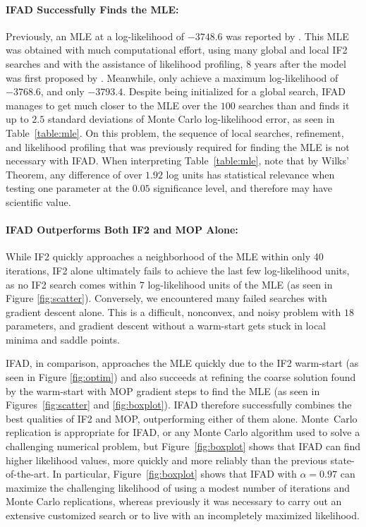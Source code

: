 \documentclass[9pt,twocolumn,pnasresearcharticle]{pnas-new}
\begin{document}
\paragraph{IFAD Successfully Finds the MLE:} Previously, an MLE at a log-likelihood of $-3748.6$ was reported by \cite{king16}.
This MLE was obtained with much computational effort, using many global and local IF2 searches and with the assistance of likelihood profiling, 8 years after the model was first proposed by \cite{king08}.
Meanwhile, \cite{ionides15} only achieve a maximum log-likelihood of $-3768.6$, and \cite{king08} only $-3793.4$.
Despite being initialized for a global search, IFAD manages to get much closer to the MLE over the $100$ searches than \cite{ionides15} and finds it up to $2.5$ standard deviations of Monte Carlo log-likelihood error, as seen in Table~\ref{table:mle}.
On this problem, the sequence of local searches, refinement, and likelihood profiling that was previously required for finding the MLE is not necessary with IFAD. 
When interpreting Table~\ref{table:mle}, note that by Wilks' Theorem, any difference of over $1.92$ log units has statistical relevance when testing one parameter at the $0.05$ significance level, and therefore may have scientific value.

\paragraph{IFAD Outperforms Both IF2 and MOP Alone:} While IF2 quickly approaches a neighborhood of the MLE within only 40 iterations, IF2 alone ultimately fails to achieve the last few log-likelihood units, as no IF2 search comes within 7 log-likelihood units of the MLE (as seen in Figure \ref{fig:scatter}). Conversely, we encountered many failed searches with gradient descent alone. This is a difficult, nonconvex, and noisy problem with $18$ parameters, and gradient descent without a warm-start gets stuck in local minima and saddle points.

IFAD, in comparison, approaches the MLE quickly due to the IF2 warm-start (as seen in Figure \ref{fig:optim}) and also succeeds at refining the coarse solution found by the warm-start with MOP gradient steps to find the MLE (as seen in Figures~\ref{fig:scatter} and \ref{fig:boxplot}). IFAD therefore successfully combines the best qualities of IF2 and MOP, outperforming either of them alone.
Monte~Carlo replication is appropriate for IFAD, or any Monte Carlo algorithm used to solve a challenging numerical problem, but Figure~\ref{fig:boxplot} shows that IFAD can find higher likelihood values, more quickly and more reliably than the previous state-of-the-art. 
In particular, Figure~\ref{fig:boxplot} shows that IFAD with $\alpha=0.97$ can maximize the challenging likelihood of \cite{king08} using a modest number of iterations and Monte Carlo replications, whereas previously it was necessary to carry out an extensive customized search or to live with an incompletely maximized likelihood.
\end{document}

